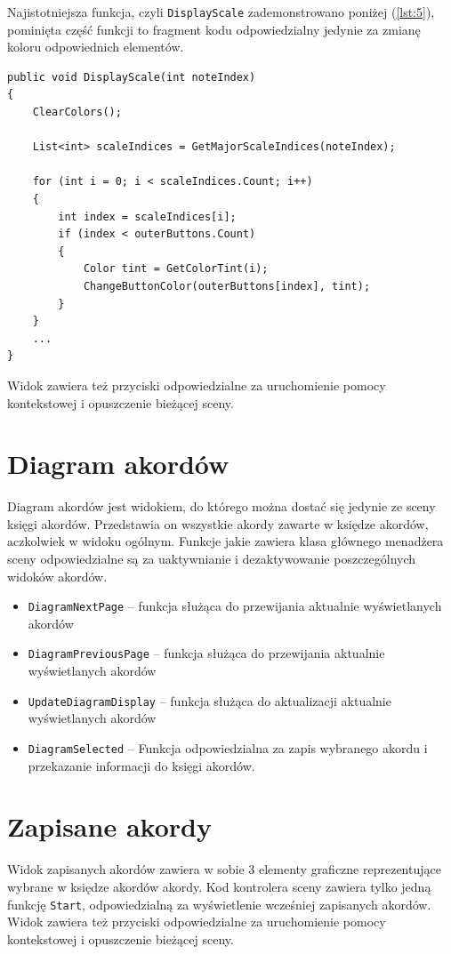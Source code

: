 Najistotniejsza funkcja, czyli \texttt{DisplayScale} zademonstrowano poniżej (\ref{lst:5}), pominięta część funkcji to fragment kodu odpowiedzialny jedynie za zmianę koloru odpowiednich elementów.

\begin{lstlisting}[style=sharpcstyle,caption=Funkcja \texttt{DisplayScale}, label=lst:5]
public void DisplayScale(int noteIndex)
{
    ClearColors();

    List<int> scaleIndices = GetMajorScaleIndices(noteIndex);

    for (int i = 0; i < scaleIndices.Count; i++)
    {
        int index = scaleIndices[i];
        if (index < outerButtons.Count)
        {
            Color tint = GetColorTint(i);
            ChangeButtonColor(outerButtons[index], tint);
        }
    }
    ...         
}
\end{lstlisting}

Widok zawiera też przyciski odpowiedzialne za uruchomienie pomocy kontekstowej i opuszczenie bieżącej sceny.

\section{Diagram akordów}

Diagram akordów jest widokiem, do którego można dostać się jedynie ze sceny księgi akordów. Przedstawia on wszystkie akordy zawarte w księdze akordów, aczkolwiek w widoku ogólnym. Funkcje jakie zawiera klasa głównego menadżera sceny odpowiedzialne są za uaktywnianie i dezaktywowanie poszczególnych widoków akordów.

\begin{itemize}
    \item \texttt{DiagramNextPage} -- funkcja służąca do przewijania aktualnie wyświetlanych akordów
    \item \texttt{DiagramPreviousPage} -- funkcja służąca do przewijania aktualnie wyświetlanych akordów
    \item \texttt{UpdateDiagramDisplay} -- funkcja służąca do aktualizacji aktualnie wyświetlanych akordów
    \item \texttt{DiagramSelected} -- Funkcja odpowiedzialna za zapis wybranego akordu i przekazanie informacji do księgi akordów.
\end{itemize}

\section{Zapisane akordy}

Widok zapisanych akordów zawiera w sobie 3 elementy graficzne reprezentujące wybrane w księdze akordów akordy. Kod kontrolera sceny zawiera tylko jedną funkcję \texttt{Start}, odpowiedzialną za wyświetlenie wcześniej zapisanych akordów. Widok zawiera też przyciski odpowiedzialne za uruchomienie pomocy kontekstowej i opuszczenie bieżącej sceny.